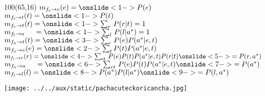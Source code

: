 \documentclass[shownotes,aspectratio=169]{beamer}
\begin{document}
\begin{frame}[plain]
\begin{textblock}{100}(65,16)
 $m_{f_e\rightarrow e}(e) = \onslide<1->{P(e)} $  \\
 $m_{f_t\rightarrow t}(t) = \onslide<1->{P(t)}$  \\
 $m_{f_r\rightarrow t}(t) = \onslide<1->{\sum_r \, P(r|t) = 1}$  \\
 $m_{f_l\rightarrow a}\phantom{(a)} = \onslide<1->{\sum_l \, P(l|a^*) = 1} $  \\
 $m_{f_a\rightarrow t}(t) = \onslide<3->{\sum_{e} \, P(e) P(a^*|e,t)}$  \\
 $m_{f_a\rightarrow e}(e) = \onslide<2->{\sum_t P(t)P(a^*|e,t)}$  \\
 $m_{f_r\rightarrow r}(r) = \onslide<4->{\sum_{et} \, P(e)P(t) P(a^*|e,t) P(r|t)} \onslide<5->{= P(r,a^*)}$ \\
 $m_{f_a\rightarrow a}\phantom{(a)} = \onslide<6->{\sum_{et} \, P(e)P(t)P(a^*|e,t)}\onslide<7->{  = P(a^*)}$  \\
 $m_{f_l\rightarrow l}(l) = \onslide<8->{P(a^*) P(l|a^*)} \onslide<9->{ = P(l,a^*)}$
 \end{textblock}

 

 
\end{frame}





\begin{frame}[plain]
\centering
  \texttt{[image: ../../aux/static/pachacuteckoricancha.jpg]}
\end{frame}
\end{document}

